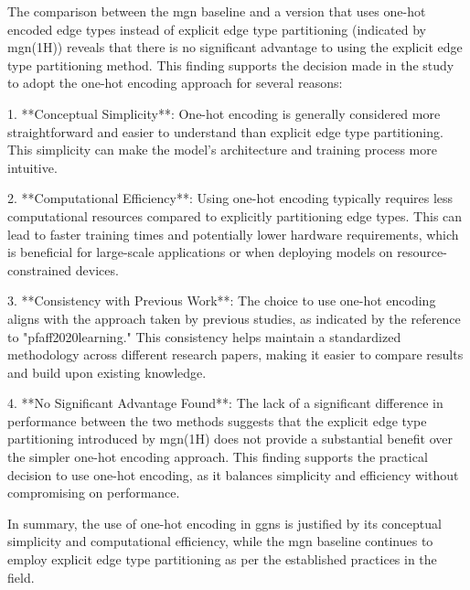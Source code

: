 The comparison between the mgn baseline and a version that uses one-hot encoded edge types instead of explicit edge type partitioning (indicated by mgn(1H)) reveals that there is no significant advantage to using the explicit edge type partitioning method. This finding supports the decision made in the study to adopt the one-hot encoding approach for several reasons:

1. **Conceptual Simplicity**: One-hot encoding is generally considered more straightforward and easier to understand than explicit edge type partitioning. This simplicity can make the model's architecture and training process more intuitive.

2. **Computational Efficiency**: Using one-hot encoding typically requires less computational resources compared to explicitly partitioning edge types. This can lead to faster training times and potentially lower hardware requirements, which is beneficial for large-scale applications or when deploying models on resource-constrained devices.

3. **Consistency with Previous Work**: The choice to use one-hot encoding aligns with the approach taken by previous studies, as indicated by the reference to "pfaff2020learning." This consistency helps maintain a standardized methodology across different research papers, making it easier to compare results and build upon existing knowledge.

4. **No Significant Advantage Found**: The lack of a significant difference in performance between the two methods suggests that the explicit edge type partitioning introduced by mgn(1H) does not provide a substantial benefit over the simpler one-hot encoding approach. This finding supports the practical decision to use one-hot encoding, as it balances simplicity and efficiency without compromising on performance.

In summary, the use of one-hot encoding in ggns is justified by its conceptual simplicity and computational efficiency, while the mgn baseline continues to employ explicit edge type partitioning as per the established practices in the field.